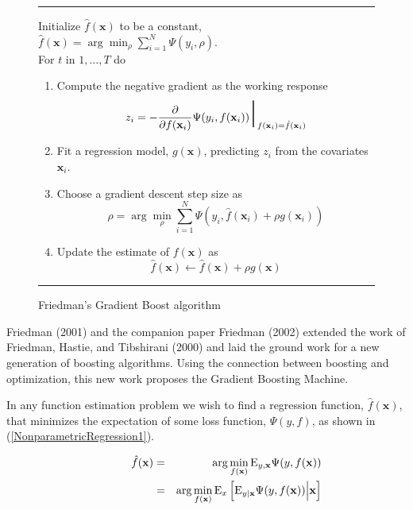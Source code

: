 \documentclass{article}
\newcommand{\EV}{\mathrm{E}}
\newcommand{\aRule}{\begin{center} \rule{5in}{1mm} \end{center}}
\begin{document}
\begin{figure} 
  \aRule Initialize $\hat f(\mathbf{x})$ to be a constant, $\hat f(\mathbf{x}) = \arg \min_{\rho} \sum_{i=1}^N \Psi(y_i,\rho)$. \\
  For $t$ in $1,\ldots,T$ do
\begin{enumerate} 
\item Compute the negative gradient as the working response
    \begin{equation}
    z_i = -\frac{\partial}{\partial f(\mathbf{x}_i)} \Psi(y_i,f(\mathbf{x}_i)) \mbox{\Huge $|$}_{f(\mathbf{x}_i)=\hat f(\mathbf{x}_i)}
    \end{equation}
\item Fit a regression model, $g(\mathbf{x})$, predicting $z_i$ from the covariates $\mathbf{x}_i$. \item Choose a gradient descent step size as
    \begin{equation}
    \rho = \arg \min_{\rho} \sum_{i=1}^N \Psi(y_i,\hat f(\mathbf{x}_i)+\rho g(\mathbf{x}_i))
    \end{equation}
\item Update the estimate of $f(\mathbf{x})$ as
    \begin{equation}
    \hat f(\mathbf{x}) \leftarrow \hat f(\mathbf{x}) + \rho g(\mathbf{x})
    \end{equation}
\end{enumerate} \aRule \caption{Friedman's Gradient Boost algorithm} \label{fig:GradientBoost} \end{figure}

Friedman (2001) and the companion paper Friedman (2002) extended the
work of Friedman, Hastie, and Tibshirani (2000) and laid the ground
work for a new generation of boosting algorithms. Using the connection
between boosting and optimization, this new work proposes the Gradient
Boosting Machine.

In any function estimation problem we wish to find a regression
function, $\hat f(\mathbf{x})$, that minimizes the expectation of some
loss function, $\Psi(y,f)$, as shown in
(\ref{NonparametricRegression1}).

\begin{eqnarray}
\hspace{0.5in}
\hat f(\mathbf{x}) &=& \arg \min_{f(\mathbf{x})} \EV_{y,\mathbf{x}} \Psi(y,f(\mathbf{x})) \nonumber \\ \label{NonparametricRegression1}
&=& \arg \min_{f(\mathbf{x})} \EV_x \left[ \EV_{y|\mathbf{x}} \Psi(y,f(\mathbf{x})) \Big| \mathbf{x} \right]
\end{eqnarray}
\end{document}
